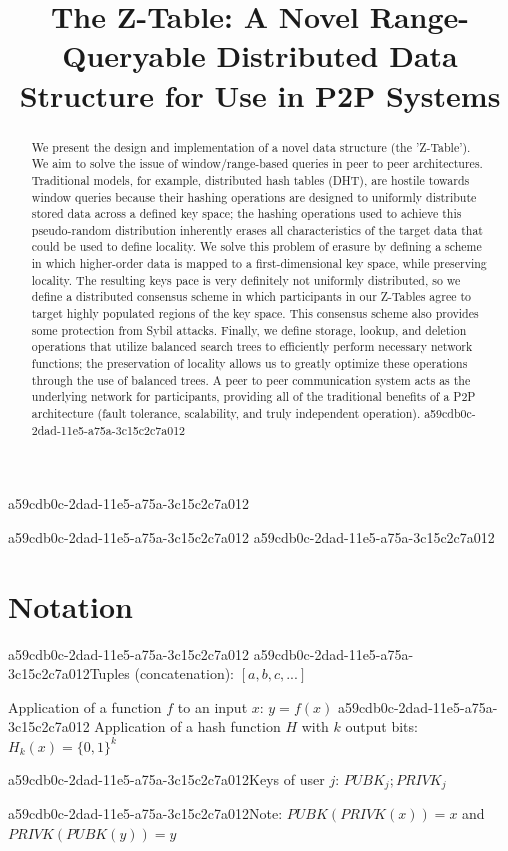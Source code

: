 \documentclass[12pt]{article}
\title{The Z-Table: A Novel Range-Queryable Distributed Data Structure for Use in P2P Systems}
\begin{document}
\maketitle

a59cdb0c-2dad-11e5-a75a-3c15c2c7a012\begin{abstract}
We present the design and implementation of a novel data structure (the 'Z-Table'). We aim to solve the issue of window/range-based queries in peer to peer architectures. Traditional models, for example,  distributed hash tables (DHT), are hostile towards window queries because their hashing operations are designed to uniformly distribute stored data across a defined key space; the hashing operations used to achieve this pseudo-random distribution inherently erases all characteristics of the target data that could be used to define locality. We solve this problem of erasure by defining a scheme in which higher-order data is mapped to a first-dimensional key space, while preserving locality. The resulting keys pace is very definitely not uniformly distributed, so we define a distributed consensus scheme in which participants in our Z-Tables agree to target highly populated regions of the key space. This consensus scheme also provides some protection from Sybil attacks. Finally, we define storage, lookup, and deletion operations that utilize balanced search trees to efficiently perform necessary network functions; the preservation of locality allows us to greatly optimize these operations through the use of balanced trees. A peer to peer communication system acts as the underlying network for participants, providing all of the traditional benefits of a P2P architecture (fault tolerance, scalability, and truly independent operation).
a59cdb0c-2dad-11e5-a75a-3c15c2c7a012\end{abstract}
a59cdb0c-2dad-11e5-a75a-3c15c2c7a012
a59cdb0c-2dad-11e5-a75a-3c15c2c7a012\section{Notation}
a59cdb0c-2dad-11e5-a75a-3c15c2c7a012
a59cdb0c-2dad-11e5-a75a-3c15c2c7a012Tuples (concatenation): $[a,b,c,...]$

Application of a function $f$ to an input $x$: $y=f(x)$
a59cdb0c-2dad-11e5-a75a-3c15c2c7a012
Application of a hash function $H$ with $k$ output bits: $H_{k}(x) = \{0,1\}^k$

a59cdb0c-2dad-11e5-a75a-3c15c2c7a012Keys of user $j$: $ PUBK_j; PRIVK_j $

a59cdb0c-2dad-11e5-a75a-3c15c2c7a012Note: $PUBK(PRIVK(x)) = x$ and $PRIVK(PUBK(y)) = y$~
\end{document}
